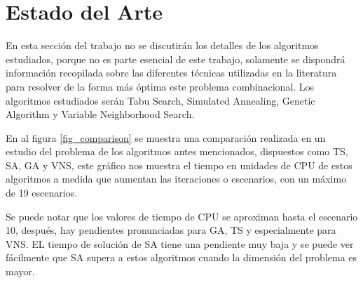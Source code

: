 \section{Estado del Arte}








En esta sección del trabajo no se discutirán los detalles de los algoritmos estudiados, porque no es parte esencial de este trabajo, solamente se dispondrá información recopilada sobre las diferentes técnicas utilizadas en la literatura para resolver de la forma más óptima este problema combinacional.
Los algoritmos estudiados serán Tabu Search, Simulated Annealing, Genetic Algorithm y Variable Neighborhood Search.

En al figura \ref{fig_comparison} se muestra una comparación realizada en un estudio del problema de los algoritmos antes mencionados, dispuestos como TS, SA, GA y VNS, este gráfico nos muestra el tiempo en unidades de CPU de estos algoritmos a medida que aumentan las iteraciones o escenarios, con un máximo de 19 escenarios.

Se puede notar que los valores de tiempo de CPU se aproximan hasta el escenario 10, después, hay pendientes pronunciadas para GA, TS y especialmente para VNS.
EL tiempo de solución de SA tiene una pendiente muy baja y se puede ver fácilmente que SA supera a estos algoritmos cuando la dimensión del problema es mayor.


